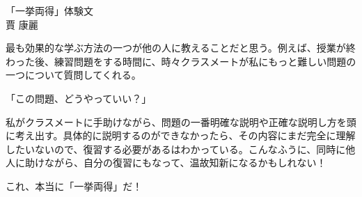 \documentclass[12pt]{article}
\begin{document}
\begin{center}
{\Large 「一挙両得」体験文}\\[1em]
賈 康麗
\end{center}

最も効果的な学ぶ方法の一つが他の人に教えることだと思う。例えば、授業が終わった後、練習問題をする時間に、時々クラスメートが私にもっと難しい問題の一つについて質問してくれる。

「この問題、どうやっていい？」

私がクラスメートに手助けながら、問題の一番明確な説明や正確な説明し方を頭に考え出す。具体的に説明するのができなかったら、その内容にまだ完全に理解したいないので、復習する必要があるはわかっている。こんなふうに、同時に他人に助けながら、自分の復習にもなって、温故知新になるかもしれない！

これ、本当に「一挙両得」だ！
\end{document}
